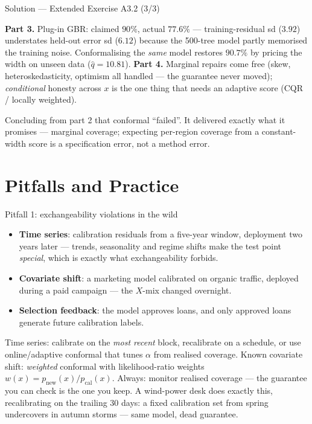 \documentclass[aspectratio=169,11pt]{beamer}
\begin{document}
\begin{frame}{Solution --- Extended Exercise A3.2 (3/3)}
\begin{solutionbox}
  \textbf{Part 3.} Plug-in GBR: claimed $90\%$, actual $\mathbf{77.6\%}$ ---
  training-residual sd ($3.92$) understates held-out error sd ($6.12$) because the
  500-tree model partly memorised the training noise. Conformalising the \emph{same}
  model restores $90.7\%$ by pricing the width on unseen data ($\hat q = 10.81$).
  \textbf{Part 4.} Marginal repairs come free (skew, heteroskedasticity, optimism all
  handled --- the guarantee never moved); \emph{conditional} honesty across $x$ is the
  one thing that needs an adaptive score (CQR / locally weighted).
\end{solutionbox}
\begin{mistake}
  Concluding from part 2 that conformal ``failed''. It delivered exactly what it
  promises --- marginal coverage; expecting per-region coverage from a constant-width
  score is a specification error, not a method error.
\end{mistake}
\end{frame}

\section{Pitfalls and Practice}

\begin{frame}{Pitfall 1: exchangeability violations in the wild}
  \footnotesize
  \begin{itemize}
    \item \textbf{Time series}: calibration residuals from a five-year window,
          deployment two years later --- trends, seasonality and regime shifts make the test point
          \emph{special}, which is exactly what exchangeability forbids.
    \item \textbf{Covariate shift}: a marketing model calibrated on organic traffic,
          deployed during a paid campaign --- the $X$-mix changed overnight.
    \item \textbf{Selection feedback}: the model approves loans, and only approved
          loans generate future calibration labels.
  \end{itemize}
  \begin{readme}
    Time series: calibrate on the \emph{most recent} block, recalibrate on a schedule,
    or use online/adaptive conformal that tunes $\alpha$ from realised coverage.
    Known covariate shift: \emph{weighted} conformal with likelihood-ratio weights
    $w(x) = p_{\text{new}}(x)/p_{\text{cal}}(x)$. Always: monitor realised coverage
    --- the guarantee you can check is the one you keep. A wind-power desk does exactly
    this, recalibrating on the trailing 30 days: a fixed calibration set from spring
    undercovers in autumn storms --- same model, dead guarantee.
  \end{readme}
\end{frame}
\end{document}
